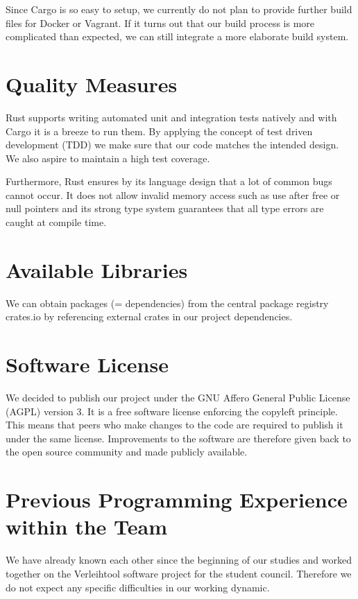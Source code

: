 \documentclass[a4paper, 11pt]{article}
\begin{document}
Since Cargo is so easy to setup, we currently do not plan to provide further build files for Docker or Vagrant. If it turns out that our build process is more complicated than expected, we can still integrate a more elaborate build system.

\section*{Quality Measures}
Rust supports writing automated unit and integration tests natively and with Cargo it is a breeze to run them. By applying the concept of test driven development (TDD) we make sure that our code matches the intended design. We also aspire to maintain a high test coverage.

Furthermore, Rust ensures by its language design that a lot of common bugs cannot occur. It does not allow invalid memory access such as use after free or null pointers and its strong type system guarantees that all type errors are caught at compile time.

\section*{Available Libraries}
We can obtain packages (= dependencies) from the central package registry crates.io \cite{Crates} by referencing external crates in our project dependencies.

\section*{Software License}
We decided to publish our project under the GNU Affero General Public License (AGPL) version 3. \cite{AGPL} It is a free software license enforcing the copyleft principle. This means that peers who make changes to the code are required to publish it under the same license. Improvements to the software are therefore given back to the open source community and made publicly available. 


\section*{Previous Programming Experience within the Team}
We have already known each other since the beginning of our studies and worked together on the Verleihtool \cite{verleihtool}  software project for the student council. Therefore we do not expect any specific difficulties in our working dynamic. 
\end{document}

